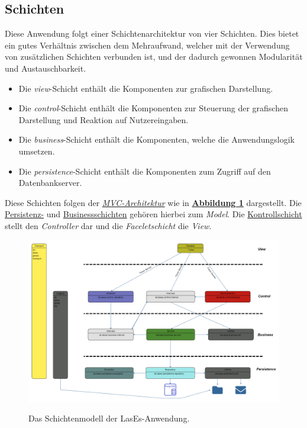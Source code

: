 
\subsection{Schichten}\label{arch:schichten}
Diese Anwendung folgt einer Schichtenarchitektur von vier Schichten. Dies bietet ein gutes Verhältnis zwischen dem Mehraufwand,
welcher mit der Verwendung von zusätzlichen Schichten verbunden ist, und der dadurch gewonnen Modularität und Austauschbarkeit.
\begin{itemize}
    \item Die \emph{view}-Schicht enthält die Komponenten zur grafischen Darstellung.
    \item Die \emph{control}-Schicht enthält die Komponenten zur Steuerung der grafischen Darstellung und Reaktion auf
    Nutzereingaben.
    \item Die \emph{business}-Schicht enthält die Komponenten, welche die Anwendungslogik umsetzen.
    \item Die \emph{persistence}-Schicht enthält die Komponenten zum Zugriff auf den Datenbankserver.
\end{itemize}
Diese Schichten folgen der \emph{\hyperref[arch:mvc]{MVC-Architektur}} wie in \textbf{\hyperref[arch:pakdia]{Abbildung 1}} dargestellt.
Die \hyperref[arch:persistence]{Persistenz-} und \hyperref[arch:business]{Businessschichten} gehören hierbei
zum \emph{Model}. Die \hyperref[arch:control]{Kontrollschicht} stellt den \emph{Controller} dar und die
\emph{Faceletschicht} %
die \emph{View}.

\begin{figure}[H]
\centering
    \includegraphics[width=0.8\linewidth]{graphics/Paketdiagramm6.0}\label{arch:pakdia}
    \caption{Das Schichtenmodell der LasEs-Anwendung.}
\end{figure}


